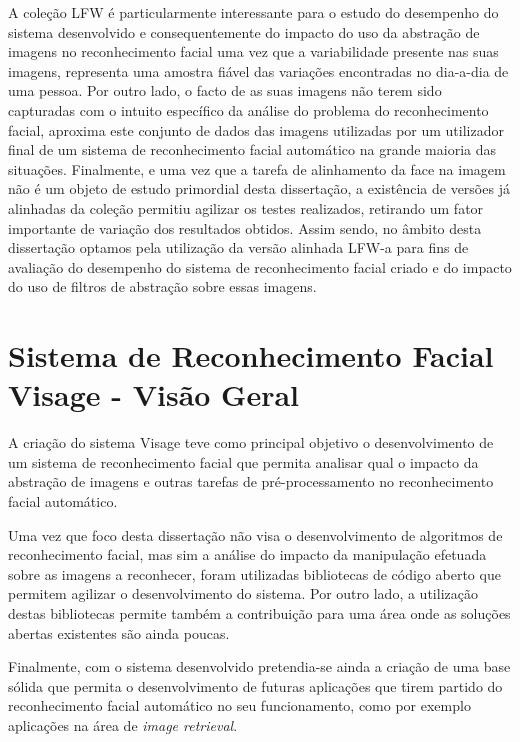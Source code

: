 A coleção LFW é particularmente interessante para o estudo do desempenho do sistema desenvolvido e consequentemente do impacto do uso da abstração de imagens no reconhecimento facial uma vez que a variabilidade presente nas suas imagens, representa uma amostra fiável das variações encontradas no dia-a-dia de uma pessoa. Por outro lado, o facto de as suas imagens não terem sido capturadas com o intuito específico da análise do problema do reconhecimento facial, aproxima este conjunto de dados das imagens utilizadas por um utilizador final de um sistema de reconhecimento facial automático na grande maioria das situações. Finalmente, e uma vez que a tarefa de alinhamento da face na imagem não é um objeto de estudo primordial desta dissertação, a existência de versões já alinhadas da coleção permitiu agilizar os testes realizados, retirando um fator importante de variação dos resultados obtidos. Assim sendo, no âmbito desta dissertação optamos pela utilização da versão alinhada LFW-a \citep{autor} para fins de avaliação do desempenho do sistema de reconhecimento facial criado e do impacto do uso de filtros de abstração sobre essas imagens.

\section{Sistema de Reconhecimento Facial Visage - Visão Geral} \label{sec:visage}
A criação do sistema Visage teve como principal objetivo o desenvolvimento de um sistema de reconhecimento facial que permita analisar qual o impacto da abstração de imagens e outras tarefas de pré-processamento no reconhecimento facial automático.

Uma vez que foco desta dissertação não visa o desenvolvimento de algoritmos de reconhecimento facial, mas sim a análise do impacto da manipulação efetuada sobre as imagens a reconhecer, foram utilizadas bibliotecas de código aberto que permitem agilizar o desenvolvimento do sistema. Por outro lado, a utilização destas bibliotecas permite também a contribuição para uma área onde as soluções abertas existentes são ainda poucas.

Finalmente, com o sistema desenvolvido pretendia-se ainda a criação de uma base sólida que permita o desenvolvimento de futuras aplicações que tirem partido do reconhecimento facial automático no seu funcionamento, como por exemplo aplicações na área de \textit{image retrieval}.

